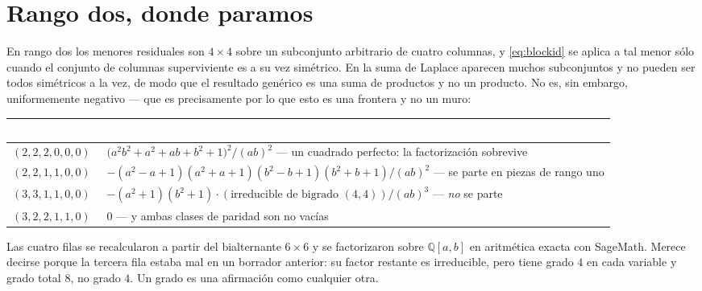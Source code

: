 \documentclass[11pt,a4paper]{article}
\begin{document}
\section{Rango dos, donde paramos}\label{sec:ranktwo}

En rango dos los menores residuales son $4\times4$ sobre un subconjunto arbitrario de cuatro
columnas, y \eqref{eq:blockid} se aplica a tal menor s\'olo cuando el conjunto de columnas
superviviente es a su vez sim\'etrico. En la suma de Laplace aparecen muchos subconjuntos y
no pueden ser todos sim\'etricos a la vez, de modo que el resultado gen\'erico es una suma de
productos y no un producto. No es, sin embargo, uniformemente negativo --- que es precisamente
por lo que esto es una frontera y no un muro:

\begin{center}\small
\begin{tabular}{lp{9.4cm}}
\toprule
\rowcolor{hdrblue}
\textcolor{white}{$\lambda$ en rango dos} & \textcolor{white}{$s_\lambda(1,-1,a,\bar a,b,\bar b)$}\\
\midrule
$(2,2,2,0,0,0)$ & $\big(a^2b^2+a^2+ab+b^2+1\big)^2/(ab)^2$ --- un cuadrado perfecto: la
factorizaci\'on sobrevive\\
\rowcolor{softgrey}
$(2,2,1,1,0,0)$ & $-(a^2{-}a{+}1)(a^2{+}a{+}1)(b^2{-}b{+}1)(b^2{+}b{+}1)/(ab)^2$ --- se parte en
piezas de rango uno\\
$(3,3,1,1,0,0)$ & $-(a^2{+}1)(b^2{+}1)\cdot(\text{irreducible de bigrado }(4,4))/(ab)^3$ --- \emph{no}
se parte\\
\rowcolor{softgrey}
$(3,2,2,1,1,0)$ & $0$ --- y ambas clases de paridad son no vac\'ias\\
\bottomrule
\end{tabular}
\end{center}

Las cuatro filas se recalcularon a partir del bialternante $6\times6$ y se factorizaron sobre
$\mathbb{Q}[a,b]$ en aritm\'etica exacta con SageMath. Merece decirse porque la tercera fila
estaba mal en un borrador anterior: su factor restante es irreducible, pero tiene grado $4$ en
cada variable y grado total $8$, no grado $4$. Un grado es una afirmaci\'on como cualquier otra.
\end{document}
